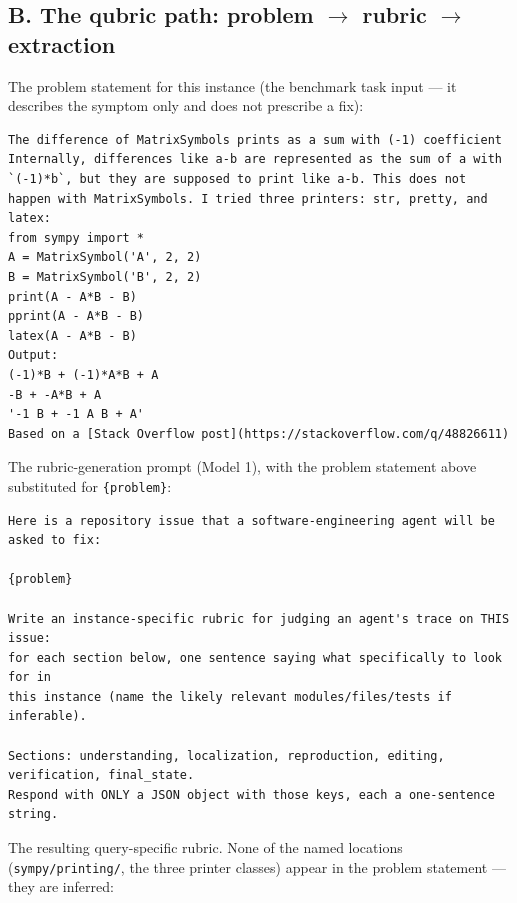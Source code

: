 \documentclass[10pt,twocolumn]{article}
\begin{document}
\subsection*{B. The qubric path: problem $\to$ rubric $\to$ extraction}
The problem statement for this instance (the benchmark task input --- it
describes the symptom only and does not prescribe a fix):

\begin{lstlisting}
The difference of MatrixSymbols prints as a sum with (-1) coefficient
Internally, differences like a-b are represented as the sum of a with `(-1)*b`, but they are supposed to print like a-b. This does not happen with MatrixSymbols. I tried three printers: str, pretty, and latex:
from sympy import *
A = MatrixSymbol('A', 2, 2)
B = MatrixSymbol('B', 2, 2)
print(A - A*B - B)
pprint(A - A*B - B)
latex(A - A*B - B)
Output:
(-1)*B + (-1)*A*B + A
-B + -A*B + A
'-1 B + -1 A B + A'
Based on a [Stack Overflow post](https://stackoverflow.com/q/48826611)
\end{lstlisting}

\noindent The rubric-generation prompt (Model 1), with the problem statement
above substituted for \texttt{\{problem\}}:

\begin{lstlisting}
Here is a repository issue that a software-engineering agent will be asked to fix:

{problem}

Write an instance-specific rubric for judging an agent's trace on THIS issue:
for each section below, one sentence saying what specifically to look for in
this instance (name the likely relevant modules/files/tests if inferable).

Sections: understanding, localization, reproduction, editing, verification, final_state.
Respond with ONLY a JSON object with those keys, each a one-sentence string.
\end{lstlisting}

\noindent The resulting query-specific rubric. None of the named locations
(\texttt{sympy/printing/}, the three printer classes) appear in the problem
statement --- they are inferred:
\end{document}
